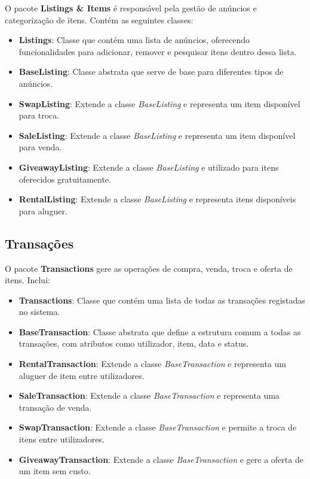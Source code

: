 \documentclass[a4paper, 12pt]{article} %
\begin{document}
O pacote \textbf{Listings \& Items} é responsável pela gestão de anúncios e categorização de itens. Contém as seguintes classes:

\begin{itemize}
	\item \textbf{Listings}: Classe que contém uma lista de anúncios, oferecendo funcionalidades para adicionar, remover e pesquisar itens dentro dessa lista.
	\item \textbf{BaseListing}: Classe abstrata que serve de base para diferentes tipos de anúncios.
	\item \textbf{SwapListing}: Extende a classe \textit{BaseListing} e representa um item disponível para troca.
	\item \textbf{SaleListing}: Extende a classe \textit{BaseListing} e representa um item disponível para venda.
	\item \textbf{GiveawayListing}: Extende a classe \textit{BaseListing} e utilizado para itens oferecidos gratuitamente.
	\item \textbf{RentalListing}: Extende a classe \textit{BaseListing} e representa itens disponíveis para aluguer.
\end{itemize}


\subsection{Transações}

O pacote \textbf{Transactions} gere as operações de compra, venda, troca e oferta de itens. Inclui:

\begin{itemize}
	\item \textbf{Transactions}: Classe que contém uma lista de todas as transações registadas no sistema.
	\item \textbf{BaseTransaction}: Classe abstrata que define a estrutura comum a todas as transações, com atributos como utilizador, item, data e status.
	\item \textbf{RentalTransaction}: Extende a classe \textit{BaseTransaction} e representa um aluguer de item entre utilizadores.
	\item \textbf{SaleTransaction}: Extende a classe \textit{BaseTransaction} e representa uma transação de venda.
	\item \textbf{SwapTransaction}: Extende a classe \textit{BaseTransaction} e permite a troca de itens entre utilizadores.
	\item \textbf{GiveawayTransaction}: Extende a classe \textit{BaseTransaction} e gere a oferta de um item sem custo.
\end{itemize}
\end{document}
